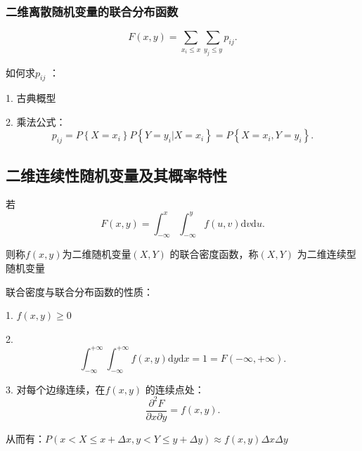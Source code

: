 \subsubsection*{二维离散随机变量的联合分布函数}%
\label{subsub:二维离散随机变量的联合分布函数}
\[
    F\left( x,y \right) =\sum_{x_{i}\le x} \sum_{y_{j}\le y} p_{ij}
.\] 

如何求$p_{ij}$ ：

1. 古典概型

2. 乘法公式：\[
    p_{ij}=P\left\{ X=x_{i} \right\} P\left\{ Y=y_{i}|X=x_{i} \right\} =P\left\{ X=x_{i},Y=y_{i} \right\} 
.\] 
\subsection{二维连续性随机变量及其概率特性}%
\label{sub:二维连续性随机变量及其概率特性}
\begin{defi}
    若\[
        F\left( x,y \right) =\int_{-\infty}^{x} \int_{-\infty}^{y} f\left( u,v \right)  \mathrm{d}v \mathrm{d}u
    .\] 

    则称$f\left( x,y \right) $为二维随机变量$(X,Y)$ 的联合密度函数，称$\left( X,Y \right) $ 为二维连续型随机变量
\end{defi}
\begin{notation}
    联合密度与联合分布函数的性质：

    1. $f\left( x,y \right) \ge 0$ 

    2. \[
        \int_{-\infty}^{+\infty} \int_{-\infty}^{+\infty} f\left( x,y \right)  \mathrm{d}y \mathrm{d}x = 1 = F\left( -\infty,+\infty \right) 
    .\] 
    
    3. 对每个边缘连续，在$f\left( x,y \right) $ 的连续点处：\[
        \frac{\partial^2 F}{\partial x\partial y} = f\left( x,y \right) 
    .\] 

    从而有：$P\left( x<X\le x+\Delta x,y<Y\le y+\Delta y \right) \approx f\left( x,y \right) \Delta x \Delta y$
\end{notation}

